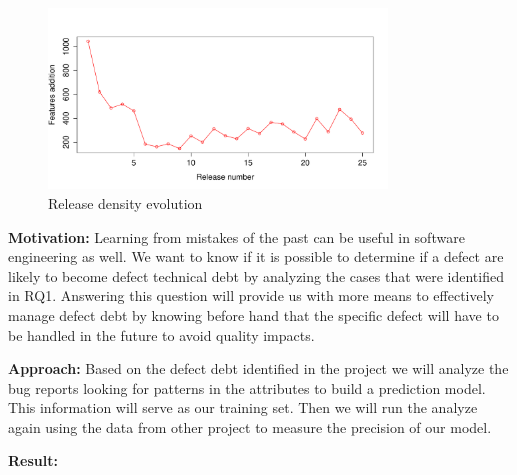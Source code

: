 \begin{figure}[thb!]
    \caption{Release density evolution}
    \label{fig:release_density}
    \includegraphics[width=90mm,scale=0.5]{figures/feature_addition_releases}
\end{figure}

\vspace{3mm}
\noindent\rqiii
\vspace{3mm}

\noindent\textbf{Motivation:} Learning from mistakes of the past can be useful in software engineering as well. We want to know if it is possible to determine if a defect are likely to become defect technical debt by analyzing the cases that were identified in RQ1. Answering this question will provide us with more means to effectively manage defect debt by knowing before hand that the specific defect will have to be handled in the future to avoid quality impacts. 

\vspace{1mm}
\noindent\textbf{Approach:} Based on the defect debt identified in the project we will analyze the bug reports looking for patterns in the attributes to build a prediction model. This information will serve as our training set. Then we will run the analyze again using the data from other project to measure the precision of our model. 

\vspace{1mm}
\noindent\textbf{Result:}